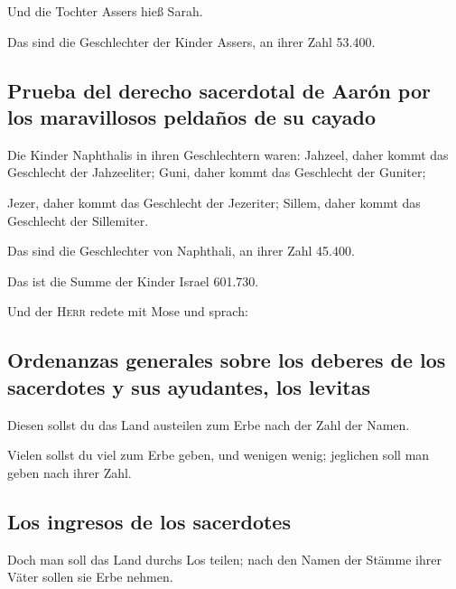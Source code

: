  Und die Tochter Assers hieß Sarah.

 Das sind die Geschlechter der Kinder Assers, an ihrer
Zahl 53.400.

\hypertarget{prueba-del-derecho-sacerdotal-de-aaruxf3n-por-los-maravillosos-peldauxf1os-de-su-cayado}{%
\subsection{Prueba del derecho sacerdotal de Aarón por los maravillosos
peldaños de su
cayado}\label{prueba-del-derecho-sacerdotal-de-aaruxf3n-por-los-maravillosos-peldauxf1os-de-su-cayado}}

 Die Kinder Naphthalis in ihren Geschlechtern waren:
Jahzeel, daher kommt das Geschlecht der Jahzeeliter; Guni, daher kommt
das Geschlecht der Guniter;

 Jezer, daher kommt das Geschlecht der Jezeriter; Sillem,
daher kommt das Geschlecht der Sillemiter.

 Das sind die Geschlechter von Naphthali, an ihrer Zahl
45.400.

 Das ist die Summe der Kinder Israel 601.730.

 Und der \textsc{Herr} redete mit Mose und sprach:

\hypertarget{ordenanzas-generales-sobre-los-deberes-de-los-sacerdotes-y-sus-ayudantes-los-levitas}{%
\subsection{Ordenanzas generales sobre los deberes de los sacerdotes y
sus ayudantes, los
levitas}\label{ordenanzas-generales-sobre-los-deberes-de-los-sacerdotes-y-sus-ayudantes-los-levitas}}

 Diesen sollst du das Land austeilen zum Erbe nach der
Zahl der Namen.

 Vielen sollst du viel zum Erbe geben, und wenigen wenig;
jeglichen soll man geben nach ihrer Zahl.

\hypertarget{los-ingresos-de-los-sacerdotes}{%
\subsection{Los ingresos de los
sacerdotes}\label{los-ingresos-de-los-sacerdotes}}

 Doch man soll das Land durchs Los teilen; nach den Namen
der Stämme ihrer Väter sollen sie Erbe nehmen.

